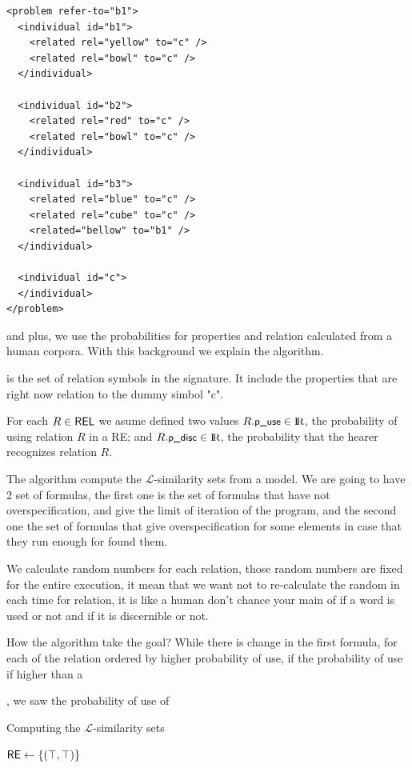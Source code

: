 \begin{verbatim}
<problem refer-to="b1">
  <individual id="b1">
    <related rel="yellow" to="c" />
    <related rel="bowl" to="c" />
  </individual>

  <individual id="b2">
    <related rel="red" to="c" />
    <related rel="bowl" to="c" />
  </individual>

  <individual id="b3">
    <related rel="blue" to="c" />
    <related rel="cube" to="c" />
    <related="bellow" to="b1" />
  </individual>
  
  <individual id="c">
  </individual>
</problem>
\end{verbatim}

and plus, we use the probabilities for properties and relation calculated from a human corpora.
With this background we explain the algorithm.

\REL is the set of relation symbols in the signature. It include the properties that are right now relation to the dummy simbol "c". 

For each $R \in \textsf{REL}$ we asume defined two values $R.\small \textsf{p\_use} \in \textrm{I}\!\textrm{R}$, the 
probability of using relation $R$ in a RE; and $R.\small \textsf{p\_disc} \in \textrm{I}\!\textrm{R}$, the 
probability that the hearer recognizes relation $R$. 

The algorithm compute the $\mathcal{L}$-similarity sets from a model. 
We are going to have 2 set of formulas, the first one is the set of formulas that have not overspecification, and give the limit of iteration of the program, and the second one the set of formulas that give overspecification for some elements in case that they run enough for found them.

We calculate random numbers for each relation, those random numbers are fixed for the entire execution, it mean that we want not to re-calculate the random in each time for relation, it is like a human don't chance your main of if a word is used or not and if it is discernible or not.

How the algorithm take the goal?
While there is change in the first formula, for each of the relation ordered by higher probability of use, if the probability of use if higher than a

, we saw the probability of use of
\begin{algorithm}[h]
\dontprintsemicolon
\caption{Computing the $\mathcal{L}$-similarity sets}
\label{algo:bisim-l}

$\textsf{RE} \leftarrow \{(\top,\top)\}$

\end{algorithm}




